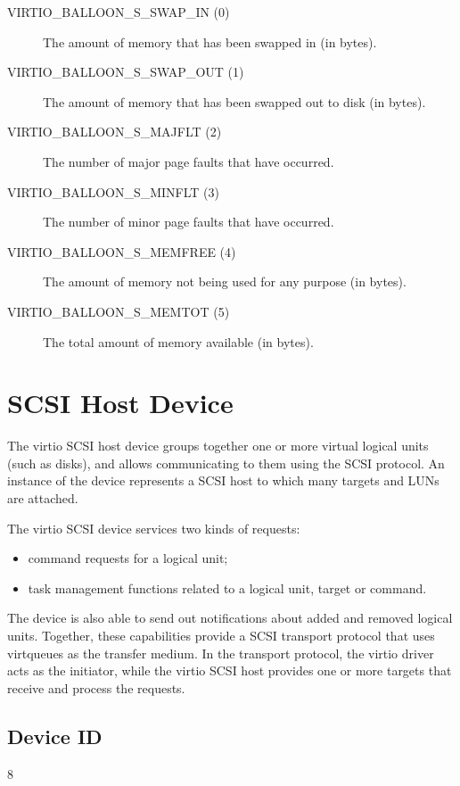 \begin{description}
\item[VIRTIO_BALLOON_S_SWAP_IN (0)] The amount of memory that has been
  swapped in (in bytes).

\item[VIRTIO_BALLOON_S_SWAP_OUT (1)] The amount of memory that has been
  swapped out to disk (in bytes).

\item[VIRTIO_BALLOON_S_MAJFLT (2)] The number of major page faults that
  have occurred.

\item[VIRTIO_BALLOON_S_MINFLT (3)] The number of minor page faults that
  have occurred.

\item[VIRTIO_BALLOON_S_MEMFREE (4)] The amount of memory not being used
  for any purpose (in bytes).

\item[VIRTIO_BALLOON_S_MEMTOT (5)] The total amount of memory available
  (in bytes).
\end{description}

\section{SCSI Host Device}\label{sec:Device Types / SCSI Host Device}

The virtio SCSI host device groups together one or more virtual
logical units (such as disks), and allows communicating to them
using the SCSI protocol. An instance of the device represents a
SCSI host to which many targets and LUNs are attached.

The virtio SCSI device services two kinds of requests:
\begin{itemize}
\item command requests for a logical unit;

\item task management functions related to a logical unit, target or
  command.
\end{itemize}

The device is also able to send out notifications about added and
removed logical units. Together, these capabilities provide a
SCSI transport protocol that uses virtqueues as the transfer
medium. In the transport protocol, the virtio driver acts as the
initiator, while the virtio SCSI host provides one or more
targets that receive and process the requests.

\subsection{Device ID}\label{sec:Device Types / SCSI Host Device / Device ID}
  8

